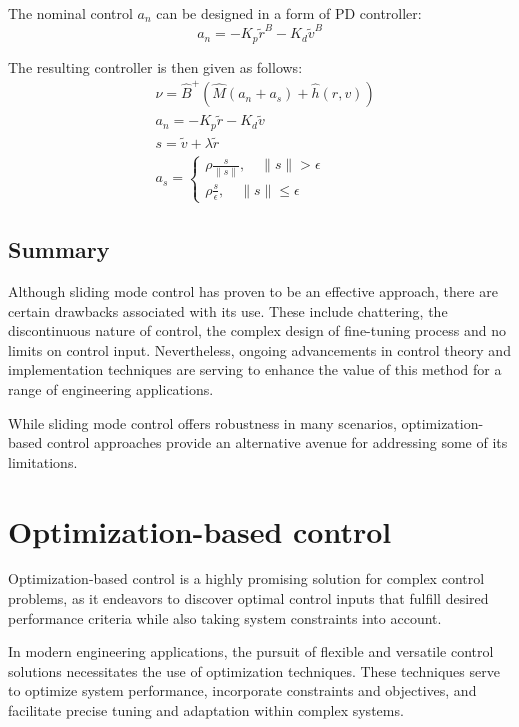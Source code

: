     The nominal control $a_n$ can be 
    designed in a form of PD controller:
    \begin{equation}
        a_n = - K_p\tilde{r}^B - K_d\tilde{v}^B
    \end{equation}

    The resulting controller is then given as follows:
    \begin{align} 
        &\nu = \hat{B}^{+}(\hat{M}(a_n + a_s) + \hat h(r, v))
        \label{eqn::sliding_mode} \\
        &a_n = - K_p\tilde{r} - K_d\tilde{v} \\
        &s = \tilde{v} + \lambda \tilde{r} \\
        &a_s = 
        \begin{cases}
        \rho \frac{s}{\|s\|}, \quad \|s\| >\epsilon\\
        \rho \frac{s}{\epsilon}, \quad \|s\| \leq\epsilon
        \end{cases}
    \end{align}

    \subsection{Summary}

    Although sliding mode control has proven to be an effective approach, 
    there are certain drawbacks associated with its use. These include 
    chattering, the discontinuous nature of control, the complex 
    design of fine-tuning process and no limits on control input. 
    Nevertheless, ongoing advancements in control theory and 
    implementation techniques are serving to enhance the value of this method 
    for a range of engineering applications.
    
    While sliding mode control offers robustness in many scenarios, 
    optimization-based control approaches provide an alternative avenue 
    for addressing some of its limitations.

\section{Optimization-based control}

Optimization-based control is a highly promising solution 
for complex control problems, as it endeavors to discover 
optimal control inputs that fulfill desired performance 
criteria while also taking system constraints into account. 

In modern engineering applications, the pursuit of flexible and versatile 
control solutions necessitates the use of optimization techniques. These 
techniques serve to optimize system performance, incorporate constraints 
and objectives, and facilitate precise tuning and adaptation within complex systems.

